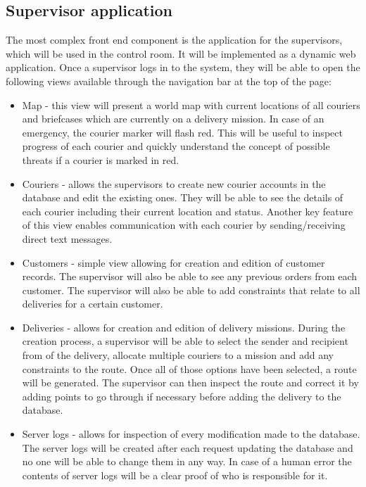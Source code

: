 \subsection{Supervisor application} \label{supervisorsarch}
The most complex front end component is the application for the supervisors, which will be used in the control room. It will be implemented as a dynamic web application. Once a supervisor logs in to the system, they will be able to open the following views available through the navigation bar at the top of the page:
\begin{itemize}
    \item Map - this view will present a world map with current locations of all couriers and briefcases which are currently on a delivery mission. In case of an emergency, the courier marker will flash red. This will be useful to inspect progress of each courier and quickly understand the concept of possible threats if a courier is marked in red.
    \item Couriers - allows the supervisors to create new courier accounts in the database and edit the existing ones. They will be able to see the details of each courier including their current location and status. Another key feature of this view enables communication with each courier by sending/receiving direct text messages.
    \item Customers - simple view allowing for creation and edition of customer records. The supervisor will also be able to see any previous orders from each customer. The supervisor will also be able to add constraints that relate to all deliveries for a certain customer.
    \item Deliveries - allows for creation and edition of delivery missions. During the creation process, a supervisor will be able to select the sender and recipient from of the delivery, allocate multiple couriers to a mission and add any constraints to the route. Once all of those options have been selected, a route will be generated. The supervisor can then inspect the route and correct it by adding points to go through if necessary before adding the delivery to the database.
    \item Server logs - allows for inspection of every modification made to the database. The server logs will be created after each request updating the database and no one will be able to change them in any way. In case of a human error the contents of server logs will be a clear proof of who is responsible for it. 
\end{itemize}
